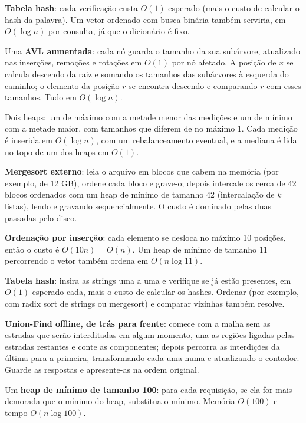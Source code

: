  \textbf{Tabela hash}: cada verificação custa $O(1)$ esperado (mais o custo de calcular o hash da palavra). Um vetor ordenado com busca binária também serviria, em $O(\log n)$ por consulta, já que o dicionário é fixo.

 Uma \textbf{AVL aumentada}: cada nó guarda o tamanho da sua subárvore, atualizado nas inserções, remoções e rotações em $O(1)$ por nó afetado. A posição de $x$ se calcula descendo da raiz e somando os tamanhos das subárvores à esquerda do caminho; o elemento da posição $r$ se encontra descendo e comparando $r$ com esses tamanhos. Tudo em $O(\log n)$.

 Dois heaps: um de máximo com a metade menor das medições e um de mínimo com a metade maior, com tamanhos que diferem de no máximo 1. Cada medição é inserida em $O(\log n)$, com um rebalanceamento eventual, e a mediana é lida no topo de um dos heaps em $O(1)$.

 \textbf{Mergesort externo}: leia o arquivo em blocos que cabem na memória (por exemplo, de 12 GB), ordene cada bloco e grave-o; depois intercale os cerca de 42 blocos ordenados com um heap de mínimo de tamanho 42 (intercalação de $k$ listas), lendo e gravando sequencialmente. O custo é dominado pelas duas passadas pelo disco.

 \textbf{Ordenação por inserção}: cada elemento se desloca no máximo 10 posições, então o custo é $O(10n)=O(n)$. Um heap de mínimo de tamanho 11 percorrendo o vetor também ordena em $O(n\log 11)$.

 \textbf{Tabela hash}: insira as strings uma a uma e verifique se já estão presentes, em $O(1)$ esperado cada, mais o custo de calcular os hashes. Ordenar (por exemplo, com radix sort de strings ou mergesort) e comparar vizinhas também resolve.

 \textbf{Union-Find offline, de trás para frente}: comece com a malha sem as estradas que serão interditadas em algum momento, una as regiões ligadas pelas estradas restantes e conte as componentes; depois percorra as interdições da última para a primeira, transformando cada uma numa \Union{} e atualizando o contador. Guarde as respostas e apresente-as na ordem original.

 Um \textbf{heap de mínimo de tamanho 100}: para cada requisição, se ela for mais demorada que o mínimo do heap, substitua o mínimo. Memória $O(100)$ e tempo $O(n\log100)$.

